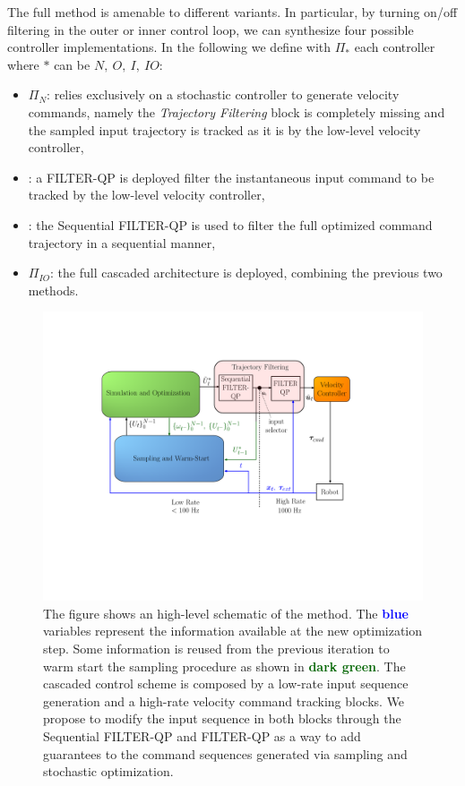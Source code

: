 The full method is amenable to different variants. In particular, by turning on/off filtering in the outer or inner control loop, we can synthesize four possible controller implementations. In the following we define with $\Pi_{*}$ each controller where $*$ can be $N,\ O,\ I,\ IO$:
\begin{itemize}
    \item $\Pi_{N}$: relies exclusively on a stochastic controller to generate velocity commands, namely the \textit{Trajectory Filtering} block is completely missing and the sampled input trajectory is tracked as it is by the low-level velocity controller,
    \item \ctrlInner: a FILTER-QP is deployed filter the instantaneous input command to be tracked by the low-level velocity controller,
    \item \ctrlOuter:  the Sequential FILTER-QP is used  to filter the full optimized command trajectory in a sequential manner,
    \item $\Pi_{IO}$: the full cascaded architecture is deployed, combining the previous two methods.
\end{itemize}

\begin{figure}[t!]
\centering
\vspace{-0.5cm}
\includegraphics[trim=120 0 50 0, clip, width=0.95\columnwidth] {figures/schemes/receding_horizon_paper.pdf}
\caption{The figure shows an high-level schematic of the method. The \textcolor{blue}{\textbf{blue}} variables represent the information available at the new optimization step. Some information is reused from the previous iteration to warm start the sampling procedure as shown in \textcolor{darkgreen}{\textbf{dark green}}. The cascaded control scheme is composed by a low-rate input sequence generation and a high-rate velocity command tracking blocks. We propose to modify the input sequence in both blocks through the Sequential FILTER-QP and FILTER-QP as a way to add guarantees to the command sequences generated via sampling and stochastic optimization.} \label{fig:block_scheme}
\end{figure}


